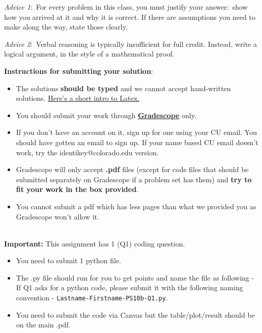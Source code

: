 \documentclass[12pt]{article}
\theoremstyle{remark}
\begin{document}
\renewcommand{\headrulewidth}{0.5pt}

\phantom{Test}

\begin{small}
\textit{Advice 1}:\ For every problem in this class, you must justify your answer:\ show how you arrived at it and why it is correct. If there are assumptions you need to make along the way, state those clearly.
\vspace{-3mm} 

\textit{Advice 2}:\ Verbal reasoning is typically insufficient for full credit. Instead, write a logical argument, in the style of a mathematical proof.\\
\vspace{-3mm} 

\textbf{Instructions for submitting your solution}:
\vspace{-5mm} 

\begin{itemize}
	\item The solutions \textbf{should be typed} and we cannot accept hand-written solutions. \href{http://ece.uprm.edu/~caceros/latex/introduction.pdf}{Here's a short intro to Latex.}
	\item You should submit your work through \href{https://www.gradescope.com/courses/59294}{\textbf{Gradescope}} only.
	\item If you don't have an account on it, sign up for one using your CU email. You should have gotten an email to sign up. If your name based CU email doesn't work, try the identikey@colorado.edu version. 
	\item Gradescope will only accept \textbf{.pdf} files (except for code files that should be submitted separately on Gradescope if a problem set has them) and \textbf{try to fit your work in the box provided}. 
	\item You cannot submit a pdf which has less pages than what we provided you as Gradescope won't allow it. 
\end{itemize}
\vspace{-4mm} 
\end{small}

\hrulefill
\pagebreak
\\
\textbf{Important:} This assignment has 1 (Q1) coding question. 
\begin{itemize}
    \item You need to submit 1 python file.
    \item The .py file should run for you to get points and name the file as following - \\
If Q1 asks for a python code, please submit it with the following naming convention - \texttt{Lastname-Firstname-PS10b-Q1.py}.
\item You need to submit the code via Canvas but the table/plot/result should be on the main .pdf.
\end{itemize}
\pagebreak
\end{document}
